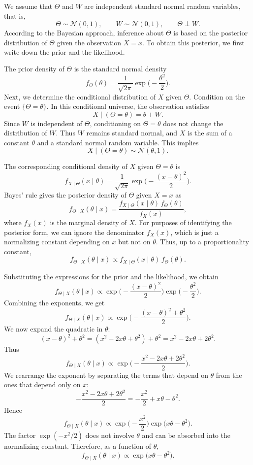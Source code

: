 We assume that \(\Theta\) and \(W\) are independent standard normal random variables, that is,
\[
\Theta \sim \mathcal{N}(0,1),
\qquad
W \sim \mathcal{N}(0,1),
\qquad
\Theta \perp W.
\]
According to the Bayesian approach, inference about \(\Theta\) is based on the posterior distribution of \(\Theta\) given the observation \(X = x\).  
To obtain this posterior, we first write down the prior and the likelihood.

The prior density of \(\Theta\) is the standard normal density
\[
f_{\Theta}(\theta)
=
\frac{1}{\sqrt{2\pi}}
\exp\Big(-\frac{\theta^{2}}{2}\Big).
\]
Next, we determine the conditional distribution of \(X\) given \(\Theta\).  
Condition on the event \(\{\Theta = \theta\}\).  
In this conditional universe, the observation satisfies
\[
X
\mid (\Theta = \theta)
=
\theta + W.
\]
Since \(W\) is independent of \(\Theta\), conditioning on \(\Theta = \theta\) does not change the distribution of \(W\).  
Thus \(W\) remains standard normal, and \(X\) is the sum of a constant \(\theta\) and a standard normal random variable.  
This implies
\[
X \mid (\Theta = \theta)
\sim
\mathcal{N}(\theta,1).
\]

The corresponding conditional density of \(X\) given \(\Theta = \theta\) is
\[
f_{X\mid\Theta}(x\mid\theta)
=
\frac{1}{\sqrt{2\pi}}
\exp\Big(-\frac{(x-\theta)^{2}}{2}\Big).
\]
Bayes' rule gives the posterior density of \(\Theta\) given \(X=x\) as
\[
f_{\Theta\mid X}(\theta\mid x)
=
\frac{f_{X\mid\Theta}(x\mid\theta)\,f_{\Theta}(\theta)}{f_{X}(x)},
\]
where \(f_{X}(x)\) is the marginal density of \(X\).  
For purposes of identifying the posterior form, we can ignore the denominator \(f_{X}(x)\), which is just a normalizing constant depending on \(x\) but not on \(\theta\).  
Thus, up to a proportionality constant,
\[
f_{\Theta\mid X}(\theta\mid x)
\propto
f_{X\mid\Theta}(x\mid\theta)\,f_{\Theta}(\theta).
\]

Substituting the expressions for the prior and the likelihood, we obtain
\[
f_{\Theta\mid X}(\theta\mid x)
\propto
\exp\Big(-\frac{(x-\theta)^{2}}{2}\Big)
\exp\Big(-\frac{\theta^{2}}{2}\Big).
\]
Combining the exponents, we get
\[
f_{\Theta\mid X}(\theta\mid x)
\propto
\exp\Big(-\frac{(x-\theta)^{2} + \theta^{2}}{2}\Big).
\]
We now expand the quadratic in \(\theta\):
\[
(x-\theta)^{2} + \theta^{2}
=
(x^{2} - 2x\theta + \theta^{2}) + \theta^{2}
=
x^{2} - 2x\theta + 2\theta^{2}.
\]
Thus
\[
f_{\Theta\mid X}(\theta\mid x)
\propto
\exp\Big(-\frac{x^{2} - 2x\theta + 2\theta^{2}}{2}\Big).
\]
We rearrange the exponent by separating the terms that depend on \(\theta\) from the ones that depend only on \(x\):
\[
-\frac{x^{2} - 2x\theta + 2\theta^{2}}{2}
=
-\frac{x^{2}}{2}
+
x\theta
-
\theta^{2}.
\]
Hence
\[
f_{\Theta\mid X}(\theta\mid x)
\propto
\exp\Big(-\frac{x^{2}}{2}\Big)
\exp\big(x\theta - \theta^{2}\big).
\]
The factor \(\exp(-x^{2}/2)\) does not involve \(\theta\) and can be absorbed into the normalizing constant.  
Therefore, as a function of \(\theta\),
\[
f_{\Theta\mid X}(\theta\mid x)
\propto
\exp\big(x\theta - \theta^{2}\big).
\]

